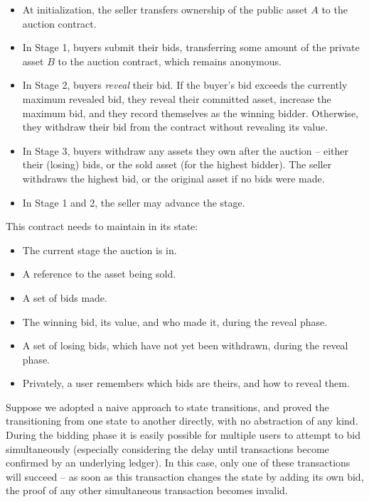 \begin{itemize}
  \item At initialization, the seller transfers ownership of the public asset $A$ to the
    auction contract.
  \item In Stage 1, buyers submit their bids, transferring some amount of
    the private asset $B$ to the auction contract, which remains anonymous.
  \item In Stage 2, buyers \emph{reveal} their bid. If the
    buyer's bid exceeds the currently maximum revealed bid, they reveal their
    committed asset, increase the maximum bid, and they record themselves as the
    winning bidder. Otherwise, they withdraw their bid from the contract without
    revealing its value.
  \item In Stage 3, buyers withdraw any assets they own after the
    auction -- either their (losing) bids, or the sold asset (for the highest
    bidder). The seller withdraws the highest bid, or the original asset if no
    bids were made.
  \item In Stage 1 and 2, the seller may advance the stage.
\end{itemize}

\noindent This contract needs to maintain in its state:
\begin{itemize}
  \item The current stage the auction is in.
  \item A reference to the asset being sold.
  \item A set of bids made.
  \item The winning bid, its value, and who made it, during the reveal phase.
  \item A set of losing bids, which have not yet been withdrawn, during the
    reveal phase.
  \item Privately, a user remembers which bids are theirs, and how to reveal
    them.
\end{itemize}

Suppose we adopted a naive approach to state transitions, and proved the
transitioning from one state to another directly, with no abstraction of any
kind. During the bidding phase it is easily possible for multiple users to
attempt to bid simultaneously (especially considering the delay until
transactions become confirmed by an underlying ledger). In this case, only one
of these transactions will succeed -- as soon as this transaction changes the
state by adding its own bid, the proof of any other simultaneous transaction
becomes invalid.

